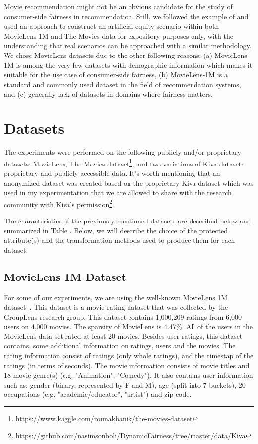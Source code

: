     Movie recommendation might not be an obvious candidate for the study of consumer-side fairness in recommendation. Still, we followed the example of \cite{yao2017beyond} and used an approach to construct an artificial equity scenario within both MovieLens-1M and The Movies data for expository purposes only, with the understanding that real scenarios can be approached with a similar methodology. We chose MovieLens datasets due to the other following reasons: (a) MovieLens-1M is among the very few datasets with demographic information which makes it suitable for the use case of consumer-side fairness, (b) MovieLens-1M is a standard and commonly used dataset in the field of recommendation systems, and (c) generally lack of datasets in domains where fairness matters.

    
\section{Datasets}

The experiments were performed on the following publicly and/or proprietary datasets: MovieLens\cite{movielens}, The Movies dataset\footnote{https://www.kaggle.com/rounakbanik/the-movies-dataset}, and two variations of Kiva dataset: proprietary and publicly accessible data.
It's worth mentioning that an anonymized dataset was created based on the proprietary Kiva dataset which was used in my experimentation that we are allowed to share with the research community with Kiva's permission\footnote{https://github.com/nasimsonboli/DynamicFairness/tree/master/data/Kiva}.



The characteristics of the previously mentioned datasets are described below and summarized in Table . Below, we will describe the choice of the protected attribute(s) and the transformation methods used to produce them for each dataset.

    \subsection{MovieLens 1M Dataset}
    For some of our experiments, we are using the well-known MovieLens 1M dataset~\cite{movielens}. This dataset is a movie rating dataset that was collected by the GroupLens research group. This dataset contains 1,000,209 ratings from 6,000 users on 4,000 movies. The sparsity of MovieLens is 4.47\%. All of the users in the MovieLens data set rated at least 20 movies.
    Besides user ratings, this dataset contains, some additional information on ratings, users and the movies. The rating information consist of ratings (only whole ratings), and the timestap of the ratings (in terms of seconds). The movie information consists of movie titles and 18 movie genre(s) (e.g. "Animation", "Comedy"). It also contains user information such as: gender (binary, represented by F and M), age (split into 7 buckets), 20 occupations (e.g. "academic/educator", "artist") and zip-code.
    
